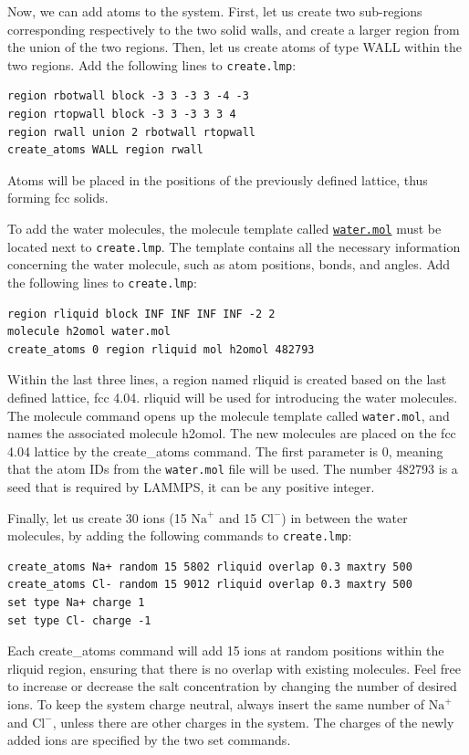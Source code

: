 \documentclass[9pt,tutorial]{livecoms}
\newcommand{\lmpcmd}[1]{\colorbox{listing}{\textcolor{command}{\small{#1}}}} %
\newcommand{\flecmd}[1]{\textcolor{command}{\texttt{#1}}} %
\newcommand{\dwlcmd}[1]{\textcolor{download}{\texttt{#1}}} %
\newcommand{\filepath}{https://raw.githubusercontent.com/lammpstutorials/lammpstutorials-article/main/files/}
\begin{document}
Now, we can add atoms to the system.  First, let us create two sub-regions corresponding
respectively to the two solid walls, and create a larger region from the union of the
two regions.  Then, let us create atoms of type WALL within the two regions.  Add the
following lines to \flecmd{create.lmp}:
\begin{lstlisting}
region rbotwall block -3 3 -3 3 -4 -3
region rtopwall block -3 3 -3 3 3 4
region rwall union 2 rbotwall rtopwall
create_atoms WALL region rwall
\end{lstlisting}
Atoms will be placed in the positions of the previously defined lattice, thus
forming fcc solids.

To add the water molecules, the molecule
template called \href{\filepath tutorial4/water.mol}{\dwlcmd{water.mol}}
must be located next to \flecmd{create.lmp}.  The template contains all the
necessary information concerning the water molecule, such as atom positions,
bonds, and angles.  Add the following lines to \flecmd{create.lmp}:
\begin{lstlisting}
region rliquid block INF INF INF INF -2 2
molecule h2omol water.mol
create_atoms 0 region rliquid mol h2omol 482793
\end{lstlisting}
Within the last three lines, a \lmpcmd{region} named \lmpcmd{rliquid} is
created based on the last defined lattice, \lmpcmd{fcc 4.04}.  \lmpcmd{rliquid}
will be used for {\color{blue} introducing} the water molecules.  The \lmpcmd{molecule} command
opens up the molecule template called \flecmd{water.mol}, and names the
associated molecule \lmpcmd{h2omol}.  The new molecules are placed on the
\lmpcmd{fcc 4.04} lattice by the \lmpcmd{create\_atoms} command.  The first
parameter is 0, meaning that the atom IDs from the \flecmd{water.mol} file
will be used.  The number \lmpcmd{482793} is a seed that is required by LAMMPS,
it can be any positive integer.

Finally, let us create 30 ions (15 $\text{Na}^+$ and 15 $\text{Cl}^-$) in between
the water molecules, by adding the following commands to \flecmd{create.lmp}:
\begin{lstlisting}
create_atoms Na+ random 15 5802 rliquid overlap 0.3 maxtry 500
create_atoms Cl- random 15 9012 rliquid overlap 0.3 maxtry 500
set type Na+ charge 1
set type Cl- charge -1
\end{lstlisting}
Each \lmpcmd{create\_atoms} command will add 15 ions at random positions
within the \lmpcmd{rliquid} region, ensuring that there is no \lmpcmd{overlap}
with existing molecules.  Feel free to increase or decrease the salt concentration
by changing the number of desired ions.  To keep the system charge neutral,
always insert the same number of $\text{Na}^+$ and $\text{Cl}^-$, unless there
are other charges in the system.  The charges of the newly added ions are specified
by the two \lmpcmd{set} commands.
\end{document}
